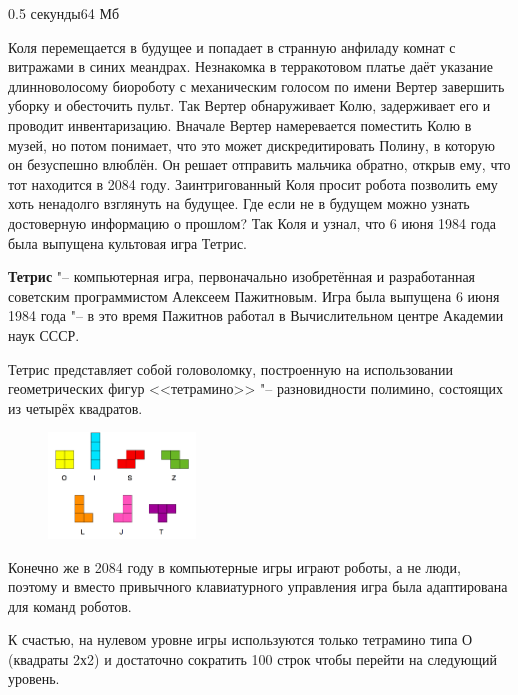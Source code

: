 \begin{problem}{}{}{}{0.5 секунды}{64 Мб}

Коля перемещается в будущее и попадает в странную анфиладу комнат с витражами в синих меандрах.
Незнакомка в терракотовом платье даёт указание длинноволосому биороботу с механическим
голосом по имени Вертер завершить уборку и обесточить пульт. Так Вертер обнаруживает Колю,
задерживает его и проводит инвентаризацию. Вначале Вертер намеревается поместить Колю в музей,
но потом понимает, что это может дискредитировать Полину, в которую он безуспешно влюблён.
Он решает отправить мальчика обратно, открыв ему, что тот находится в 2084 году. Заинтригованный
Коля просит робота позволить ему хоть ненадолго взглянуть на будущее. Где если не в будущем можно
узнать достоверную информацию о прошлом? Так Коля и узнал, что 6 июня 1984 года была выпущена
культовая игра Тетрис.

{\bf {Тетрис}} "-- компьютерная игра, первоначально изобретённая и разработанная советским
программистом Алексеем Пажитновым. Игра была выпущена 6 июня 1984 года "-- в это время Пажитнов
работал в Вычислительном центре Академии наук СССР.

Тетрис представляет собой головоломку, построенную на использовании геометрических фигур
<<тетрамино>> "-- разновидности полимино, состоящих из четырёх квадратов.

\begin{figure}
\vspace{-20pt}
  \begin{center}
    \includegraphics[width=0.35\textwidth,natwidth=267,natheight=200]{tetromino.png}
  \end{center}
  \vspace{-20pt}
  \vspace{1pt}
\end{figure}

Конечно же в 2084 году в компьютерные игры играют роботы, а не люди, поэтому и вместо
привычного клавиатурного управления игра была адаптирована для команд роботов.

К счастью, на нулевом уровне игры используются только тетрамино типа О (квадраты 2х2) и достаточно
сократить 100 строк чтобы перейти на следующий уровень.


\end{problem}
